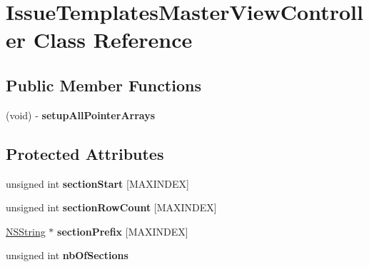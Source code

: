 \hypertarget{interface_issue_templates_master_view_controller}{
\section{IssueTemplatesMasterViewController Class Reference}
\label{interface_issue_templates_master_view_controller}
}
\subsection*{Public Member Functions}
\begin{DoxyCompactItemize}
\item 
\hypertarget{interface_issue_templates_master_view_controller_a935e9e050658d14eb8e9e1a112c1a69a}{
(void) -\/ {\bfseries setupAllPointerArrays}}
\label{interface_issue_templates_master_view_controller_a935e9e050658d14eb8e9e1a112c1a69a}

\end{DoxyCompactItemize}
\subsection*{Protected Attributes}
\begin{DoxyCompactItemize}
\item 
\hypertarget{interface_issue_templates_master_view_controller_ac0bf30885518824c2651ba70bf313e6a}{
unsigned int {\bfseries sectionStart} \mbox{[}MAXINDEX\mbox{]}}
\label{interface_issue_templates_master_view_controller_ac0bf30885518824c2651ba70bf313e6a}

\item 
\hypertarget{interface_issue_templates_master_view_controller_a872d11785b8e5b9cad6c380efbcdd35b}{
unsigned int {\bfseries sectionRowCount} \mbox{[}MAXINDEX\mbox{]}}
\label{interface_issue_templates_master_view_controller_a872d11785b8e5b9cad6c380efbcdd35b}

\item 
\hypertarget{interface_issue_templates_master_view_controller_a140a4ffac6a54696516f8eb9a46469b6}{
\hyperlink{class_n_s_string}{NSString} $\ast$ {\bfseries sectionPrefix} \mbox{[}MAXINDEX\mbox{]}}
\label{interface_issue_templates_master_view_controller_a140a4ffac6a54696516f8eb9a46469b6}

\item 
\hypertarget{interface_issue_templates_master_view_controller_a2420c9ba7ae88aec57b69e5869c36ef3}{
unsigned int {\bfseries nbOfSections}}
\label{interface_issue_templates_master_view_controller_a2420c9ba7ae88aec57b69e5869c36ef3}

\end{DoxyCompactItemize}
